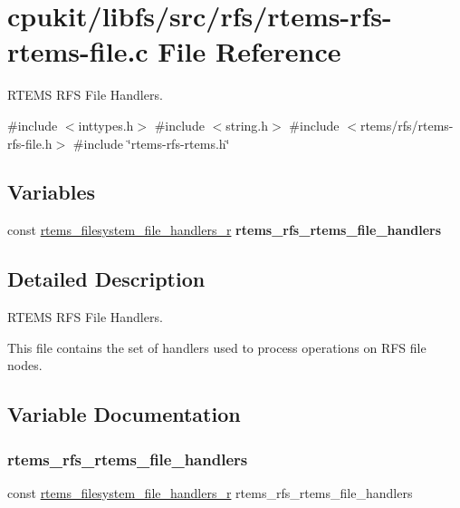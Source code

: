\hypertarget{rtems-rfs-rtems-file_8c}{}\section{cpukit/libfs/src/rfs/rtems-\/rfs-\/rtems-\/file.c File Reference}
\label{rtems-rfs-rtems-file_8c}


R\+T\+E\+MS R\+FS File Handlers.  


{\ttfamily \#include $<$inttypes.\+h$>$}\newline
{\ttfamily \#include $<$string.\+h$>$}\newline
{\ttfamily \#include $<$rtems/rfs/rtems-\/rfs-\/file.\+h$>$}\newline
{\ttfamily \#include \char`\"{}rtems-\/rfs-\/rtems.\+h\char`\"{}}\newline
\subsection*{Variables}
\begin{DoxyCompactItemize}
\item 
const \mbox{\hyperlink{struct__rtems__filesystem__file__handlers__r}{rtems\+\_\+filesystem\+\_\+file\+\_\+handlers\+\_\+r}} {\bfseries rtems\+\_\+rfs\+\_\+rtems\+\_\+file\+\_\+handlers}
\end{DoxyCompactItemize}


\subsection{Detailed Description}
R\+T\+E\+MS R\+FS File Handlers. 

This file contains the set of handlers used to process operations on R\+FS file nodes. 

\subsection{Variable Documentation}
\mbox{\label{rtems-rfs-rtems-file_8c_ac411402e0058199f17bf290e6acc2118}} 
\subsubsection{\texorpdfstring{rtems\_rfs\_rtems\_file\_handlers}{rtems\_rfs\_rtems\_file\_handlers}}
{\footnotesize\ttfamily const \mbox{\hyperlink{struct__rtems__filesystem__file__handlers__r}{rtems\+\_\+filesystem\+\_\+file\+\_\+handlers\+\_\+r}} rtems\+\_\+rfs\+\_\+rtems\+\_\+file\+\_\+handlers}

